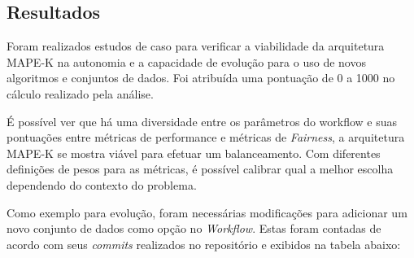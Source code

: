 \documentclass[posterIC]{a0poster}
\begin{document}
\begin{multicols}{2}
\section{Resultados}

Foram realizados estudos de caso para verificar a viabilidade da arquitetura MAPE-K na autonomia e a capacidade de evolução para o uso de novos algoritmos e conjuntos de dados. Foi atribuída uma pontuação de 0 a 1000 no cálculo realizado pela análise.

\begin{center}
\label{tbl:ScoreMAPEKGeral5050}
\end{center}

É possível ver que há uma diversidade entre os parâmetros do workflow e suas pontuações entre métricas de performance e métricas de \textit{Fairness}, a arquitetura MAPE-K se mostra viável para efetuar um balanceamento. Com diferentes definições de pesos para as métricas, é possível calibrar qual a melhor escolha dependendo do contexto do problema.

Como exemplo para evolução, foram necessárias modificações para adicionar um novo conjunto de dados como opção no \textit{Workflow}. Estas foram contadas de acordo com seus \textit{commits} realizados no repositório e exibidos na tabela abaixo:


\end{multicols}
\end{document}
